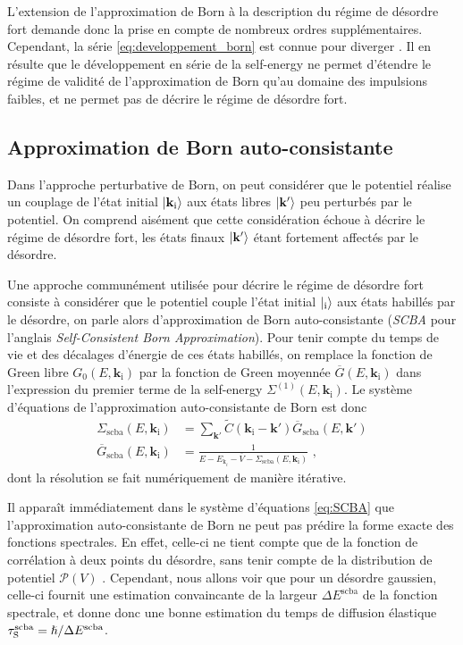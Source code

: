 L'extension de l'approximation de Born à la description du régime de désordre fort demande donc la prise en compte de nombreux ordres supplémentaires. Cependant, la série \ref{eq:developpement_born} est connue pour diverger \citep{kuhn2007coherent}. Il en résulte que le développement en série de la self-energy ne permet d'étendre le régime de validité de l'approximation de Born qu'au domaine des impulsions faibles, et ne permet pas de décrire le régime de désordre fort.


\subsection{Approximation de Born auto-consistante}
Dans l'approche perturbative de Born, on peut considérer que le potentiel réalise un couplage de l'état initial $\left| \mathbf{k}_{\mathrm{i}} \right\rangle$ aux états libres $\left| \mathbf{k}' \right\rangle$ peu perturbés par le potentiel. On comprend aisément que cette considération échoue à décrire le régime de désordre fort, les états finaux $\left| \mathbf{k}' \right\rangle$ étant fortement affectés par le désordre. 

Une approche communément utilisée pour décrire le régime de désordre fort consiste à considérer que le potentiel couple l'état initial $\left| \mathbf{}_{\mathrm{i}} \right\rangle$ aux états habillés par le désordre, on parle alors d'approximation de Born auto-consistante (\emph{SCBA} pour l'anglais \emph{Self-Consistent Born Approximation}). Pour tenir compte du temps de vie et des décalages d'énergie de ces états habillés, on remplace la fonction de Green libre $G_0(E,\mathbf{k}_{\mathrm{i}})$ par la fonction de Green moyennée $\overline{G}(E,\mathbf{k}_{\mathrm{i}})$ dans l'expression du premier terme de la self-energy $\Sigma^{(1)}(E,\mathbf{k}_{\mathrm{i}})$. Le système d'équations de l'approximation auto-consistante de Born est donc
\begin{align}
\Sigma_{\mathrm{scba}}(E,\mathbf{k}_{\mathrm{i}})&=\sum_{\mathbf{k}'}{\widetilde{C}(\mathbf{k}_{\mathrm{i}}-\mathbf{k}') \overline{G}_{\mathrm{scba}}(E,\mathbf{k}')}  
\label{eq:SCBA}\\
\overline{G}_{\mathrm{scba}}(E,\mathbf{k}_{\mathrm{i}}) &= \frac{1}{E-E_{\mathrm{k}_i} - \overline{V} - \Sigma_{\mathrm{scba}}(E,\mathbf{k}_{\mathrm{i}})} \text{ ,}
\end{align}
dont la résolution se fait numériquement de manière itérative.

Il apparaît immédiatement dans le système d'équations \ref{eq:SCBA} que l'approximation auto-consistante de Born ne peut pas prédire la forme exacte des fonctions spectrales. En effet, celle-ci ne tient compte que de la fonction de corrélation à deux points du désordre, sans tenir compte de la distribution de potentiel $\mathcal{P}(V)$ \citep{pasek2015phase}. Cependant, nous allons voir que pour un désordre gaussien, celle-ci fournit une estimation convaincante de la largeur $\Delta E^{\mathrm{scba}}$ de la fonction spectrale, et donne donc une bonne estimation du temps de diffusion élastique $\tau_{\mathrm{S}}^{\mathrm{scba}}=\hslash/\Delta E^{\mathrm{scba}}$. 

